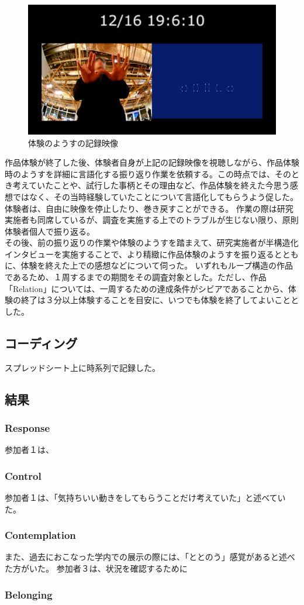 \begin{figure}[H]
  \centering
  \includegraphics[width=15cm]{img/record_monitor.jpg}
  \caption{体験のようすの記録映像}
  \label{fig:record_monitor}
\end{figure}

作品体験が終了した後、体験者自身が上記の記録映像を視聴しながら、作品体験時のようすを詳細に言語化する振り返り作業を依頼する。この時点では、そのとき考えていたことや、試行した事柄とその理由など、作品体験を終えた今思う感想ではなく、その当時経験していたことについて言語化してもらうよう促した。体験者は、自由に映像を停止したり、巻き戻すことができる。
作業の際は研究実施者も同席しているが、調査を実施する上でのトラブルが生じない限り、原則体験者個人で振り返る。\\
その後、前の振り返りの作業や体験のようすを踏まえて、研究実施者が半構造化インタビューを実施することで、より精緻に作品体験のようすを振り返るとともに、体験を終えた上での感想などについて伺った。
いずれもループ構造の作品であるため、１周するまでの期間をその調査対象とした。ただし、作品「Relation」については、一周するための達成条件がシビアであることから、体験の終了は３分以上体験することを目安に、いつでも体験を終了してよいこととした。

\subsection{コーディング}
スプレッドシート上に時系列で記録した。

\subsection{結果}
\subsubsection{Response}
参加者１は、

\subsubsection{Control}
参加者１は、「気持ちいい動きをしてもらうことだけ考えていた」と述べていた。

\subsubsection{Contemplation}
また、過去におこなった学内での展示の際には、「ととのう」感覚があると述べた方がいた。
参加者３は、状況を確認するために

\subsubsection{Belonging}